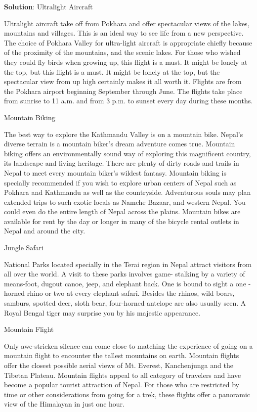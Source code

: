 \documentclass[
  openany]{book}
\newenvironment{solution}{ {\bfseries Solution}:}{}
\begin{document}
\begin{questions}
\begin{solution}
Ultralight Aircraft

Ultralight aircraft take off from Pokhara and offer spectacular views of the lakes, mountains and villages. This is an ideal way to see life from a new perspective. The choice of Pokhara Valley for ultra-light aircraft is appropriate chiefly because of the proximity of the mountains, and the scenic lakes. For those who wished they could fly birds when growing up, this flight is a must. It might be lonely at the top, but this flight is a must. It might be lonely at the top, but the spectacular view from up high certainly makes it all worth it. Flights are from the Pokhara airport beginning September through June. The flights take place from sunrise to 11 a.m. and from 3 p.m. to sunset every day during these months.

Mountain Biking

The best way to explore the Kathmandu Valley is on a mountain bike. Nepal’s diverse terrain is a mountain biker’s dream adventure comes true. Mountain biking offers an environmentally sound way of exploring this magnificent country, its landscape and living heritage. There are plenty of dirty roads and trails in Nepal to meet every mountain biker’s wildest fantasy. Mountain biking is specially recommended if you wish to explore urban centers of Nepal such as Pokhara and Kathmandu as well as the countryside. Adventurous souls may plan extended trips to such exotic locals as Namche Bazaar, and western Nepal. You could even do the entire length of Nepal across the plains. Mountain bikes are available for rent by the day or longer in many of the bicycle rental outlets in Nepal and around the city.

Jungle Safari

National Parks located specially in the Terai region in Nepal attract visitors from all over the world. A visit to these parks involves game- stalking by a variety of means-foot, dugout canoe, jeep, and elephant back. One is bound to sight a one - horned rhino or two at every elephant safari. Besides the rhinos, wild boars, samburs, spotted deer, sloth bear, four-horned antelope are also usually seen. A Royal Bengal tiger may surprise you by his majestic appearance.

Mountain Flight

Only awe-stricken silence can come close to matching the experience of going on a mountain flight to encounter the tallest mountains on earth. Mountain flights offer the closest possible aerial views of Mt. Everest, Kanchenjunga and the Tibetan Plateau. Mountain flights appeal to all category of travelers and have become a popular tourist attraction of Nepal. For those who are restricted by time or other considerations from going for a trek, these flights offer a panoramic view of the Himalayan in just one hour.


\end{solution}
\end{questions}
\end{document}
